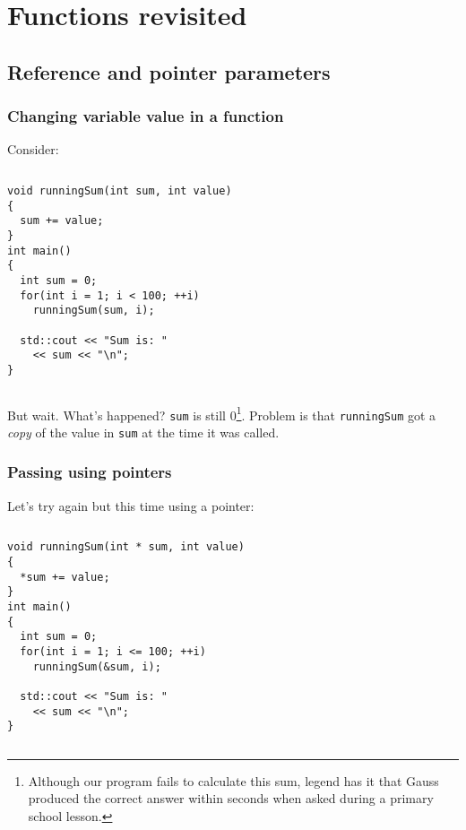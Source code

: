 \documentclass{beamer}
\begin{document}
\section{Functions revisited}

\subsection{Reference and pointer parameters}


\begin{frame}[fragile]
  \frametitle{Changing variable value in a function}
  Consider:
  \begin{columns}[t]
    \begin{column}[T]{0.6\textwidth}
	    \begin{lstlisting}[aboveskip=0pt]
void runningSum(int sum, int value)
{
  sum += value;
}
int main()
{
  int sum = 0;
  for(int i = 1; i < 100; ++i)
    runningSum(sum, i);
    
  std::cout << "Sum is: "
    << sum << "\n";
}
      \end{lstlisting}
    \end{column}
    \begin{column}[T]{0.4\textwidth}
    \end{column}
  \end{columns}
  But wait.  What's happened? \texttt{sum} is still 0\footnote{Although our program fails to calculate this sum, legend has it that Gauss produced the correct answer within seconds when asked during a primary school lesson.}.
  \newline\pause
  Problem is that \texttt{runningSum} got a \textit{copy} of the value in \texttt{sum} at the time it was called.

\end{frame}

\begin{frame}[fragile]
  \frametitle{Passing using pointers}
  
  Let's try again but this time using a pointer:
  \begin{columns}[t]
    \begin{column}[T]{0.6\textwidth}
	    \begin{lstlisting}[aboveskip=0pt]
void runningSum(int * sum, int value)
{
  *sum += value;
}
int main()
{
  int sum = 0;
  for(int i = 1; i <= 100; ++i)
    runningSum(&sum, i);
    
  std::cout << "Sum is: "
    << sum << "\n";
}
      \end{lstlisting}
    \end{column}
    \begin{column}[T]{0.4\textwidth}
    \end{column}
  \end{columns}
  
\end{frame}
\end{document}
